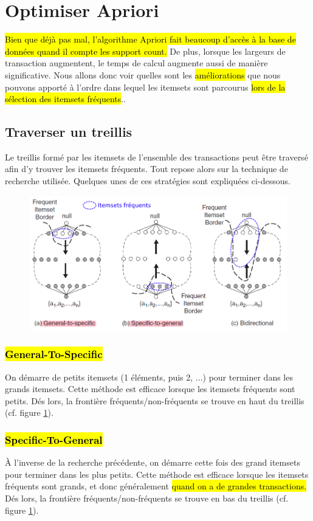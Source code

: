 \documentclass[letterpaper, 12pt]{article}
\newcommand{\alinea}{
\hspace*{0.5cm}}
\begin{document}
	\section{Optimiser Apriori}
		\alinea \hl{Bien que déjà pas mal, l'algorithme Apriori fait beaucoup
			d'accès à la base de données quand il compte les support count.}
			De plus, lorsque les largeurs de transaction augmentent, le
			temps de calcul augmente aussi de manière significative.
			Nous allons donc voir quelles sont les \hl{améliorations} 
			que nous pouvons apporté à l'ordre dans lequel les itemsets
			sont parcourus \hl{lors de la sélection des itemsets fréquents}..
		\subsection{Traverser un treillis}
			\alinea Le treillis formé par les itemsets de l'ensemble des 
				transactions peut être traversé afin d'y trouver les 
				itemsets fréquents. Tout repose alors sur la technique
				de recherche utilisée. Quelques unes de ces stratégies 
				sont expliquées ci-dessous.
			\begin{figure}[H]
				\centering
				\includegraphics[scale=0.65]{Images/lattice_1.png}
				\caption{}
				\label{fig:lattice:1}
			\end{figure}\noindent
			\subsubsection{\hl{General-To-Specific}}
				\alinea On démarre de petits itemsets 
					(1 éléments, puis 2, ...) pour terminer dans les
					grands itemsets.
					Cette méthode est efficace lorsque les itemsets 
					fréquents sont petits. Dés lors, la frontière
					fréquents/non-fréquents se trouve en haut du treillis
					(cf. figure \ref{fig:lattice:1}).
			\subsubsection{\hl{Specific-To-General}}
				\alinea \`A l'inverse de la recherche précédente, on 
					démarre cette fois des grand itemsets pour terminer
					dans les plus petits. Cette méthode est efficace 
					lorsque les itemsets fréquents sont grands, et donc
					généralement \hl{quand on a de grandes transactions.} 
					Dés lors, la frontière
					fréquents/non-fréquents se trouve en bas du treillis
					(cf. figure \ref{fig:lattice:1}).
\end{document}
